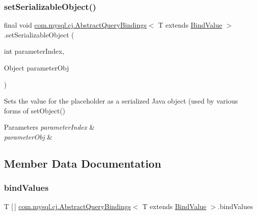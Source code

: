 \subsubsection{\texorpdfstring{set\+Serializable\+Object()}{setSerializableObject()}}
{\footnotesize\ttfamily final void \mbox{\hyperlink{classcom_1_1mysql_1_1cj_1_1_abstract_query_bindings}{com.\+mysql.\+cj.\+Abstract\+Query\+Bindings}}$<$ T extends \mbox{\hyperlink{interfacecom_1_1mysql_1_1cj_1_1_bind_value}{Bind\+Value}} $>$.set\+Serializable\+Object (\begin{DoxyParamCaption}\item[{int}]{parameter\+Index,  }\item[{Object}]{parameter\+Obj }\end{DoxyParamCaption})\hspace{0.3cm}{\ttfamily [protected]}}

Sets the value for the placeholder as a serialized Java object (used by various forms of set\+Object()


\begin{DoxyParams}{Parameters}
{\em parameter\+Index} & \\
\hline
{\em parameter\+Obj} & \\
\hline
\end{DoxyParams}


\subsection{Member Data Documentation}
\mbox{\label{classcom_1_1mysql_1_1cj_1_1_abstract_query_bindings_a89ff142df297b89a337489fe8f4e0266}} 
\subsubsection{\texorpdfstring{bind\+Values}{bindValues}}
{\footnotesize\ttfamily T \mbox{[}$\,$\mbox{]} \mbox{\hyperlink{classcom_1_1mysql_1_1cj_1_1_abstract_query_bindings}{com.\+mysql.\+cj.\+Abstract\+Query\+Bindings}}$<$ T extends \mbox{\hyperlink{interfacecom_1_1mysql_1_1cj_1_1_bind_value}{Bind\+Value}} $>$.bind\+Values\hspace{0.3cm}{\ttfamily [protected]}}

